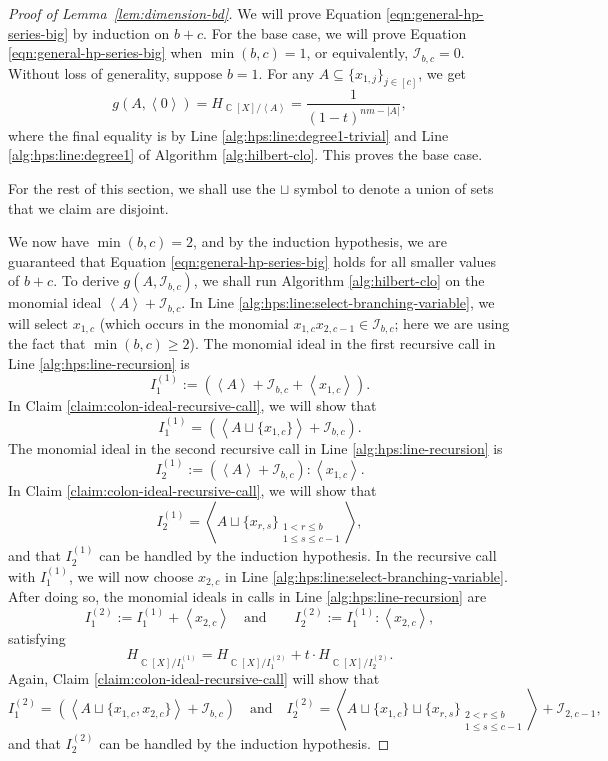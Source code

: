 \documentclass[11pt,reqno]{amsart}
\DeclareMathOperator{\C}{\mathbb{C}}
\newcommand{\suchthat}{:}
\newcommand{\ideal}[1]{\left\langle#1\right\rangle}
\theoremstyle{definition}
\numberwithin{equation}{section}
\begin{document}
\begin{proof}[Proof of Lemma~\ref{lem:dimension-bd}]
We will prove Equation \eqref{eqn:general-hp-series-big} by induction on $b + c$. For the base case, we will prove Equation \eqref{eqn:general-hp-series-big} when $\min(b, c) = 1$, or equivalently, $\mathcal{I}_{b, c} = 0$. Without loss of generality, suppose $b = 1$. For any $A \subseteq \{x_{1, j}\}_{j \in [c]}$, we get
\[
g(A, \ideal{0}) = H_{\C[X] / \ideal{A}} = \frac{1}{(1-t)^{nm - |A|}},
\]
where the final equality is by Line \ref{alg:hps:line:degree1-trivial} and Line \ref{alg:hps:line:degree1} of Algorithm \ref{alg:hilbert-clo}. This proves the base case.

For the rest of this section, we shall use the $\sqcup$ symbol to denote a union of sets that we claim are disjoint.

We now have $\min(b, c) = 2$, and by the induction hypothesis, we are guaranteed that Equation \eqref{eqn:general-hp-series-big} holds for all smaller values of $b + c$. To derive $g(A, \mathcal{I}_{b, c})$, we shall run Algorithm \ref{alg:hilbert-clo} on the monomial ideal $\ideal{A} + \mathcal{I}_{b, c}$. In Line \ref{alg:hps:line:select-branching-variable}, we will select $x_{1, c}$ (which occurs in the monomial $x_{1,c} x_{2,c-1} \in \mathcal{I}_{b,c}$; here we are using the fact that $\min(b,c) \geq 2$). The monomial ideal in the first recursive call in Line \ref{alg:hps:line-recursion} is 
\[
I^{(1)}_1 := \left(\ideal{A} + \mathcal{I}_{b, c} + \ideal{x_{1, c}}\right).
\] In Claim \ref{claim:colon-ideal-recursive-call}, we will show that 
\[
I^{(1)}_1 = \left(\ideal{A \sqcup \{x_{1, c}\}} + \mathcal{I}_{b, c}\right).
\] The monomial ideal in the second recursive call in Line \ref{alg:hps:line-recursion} is 
\[
I^{(1)}_2 := \left(\ideal{A} + \mathcal{I}_{b, c}\right) \suchthat \ideal{x_{1, c}}.
\] In Claim \ref{claim:colon-ideal-recursive-call}, we will show that 
\[
I^{(1)}_2 = \ideal{A \sqcup \{x_{r, s}\}_{\substack{1 < r \le b \\ 1 \le s \le c-1}}},
\] and that $I^{(1)}_2$ can be handled by the induction hypothesis. In the recursive call with $I_{1}^{(1)}$, we will now choose $x_{2, c}$ in Line \ref{alg:hps:line:select-branching-variable}. After doing so, the monomial ideals in calls in Line \ref{alg:hps:line-recursion} are 
\[
I^{(2)}_1 := I_1^{(1)} + \ideal{x_{2, c}} \quad \text{and} \qquad I^{(2)}_2 := I_1^{(1)} \suchthat \ideal{x_{2, c}},
\] satisfying 
\[
H_{\C[X] / I_1^{(1)}} = H_{\C[X] / I_1^{(2)}} + t\cdot H_{\C[X] / I_2^{(2)}}.
\] Again, Claim \ref{claim:colon-ideal-recursive-call} will show that 
\[
I^{(2)}_1 = \left(\ideal{A \sqcup \{x_{1, c}, x_{2, c}\}} + \mathcal{I}_{b, c}\right) \quad \text{and} \quad I^{(2)}_2 = \ideal{A \sqcup \{x_{1, c}\} \sqcup \{x_{r, s}\}_{\substack{2 < r \le b \\ 1 \le s \le c-1}}} + \mathcal{I}_{2, c-1},
\] and that $I^{(2)}_2$ can be handled by the induction hypothesis.


\end{proof}
\end{document}
